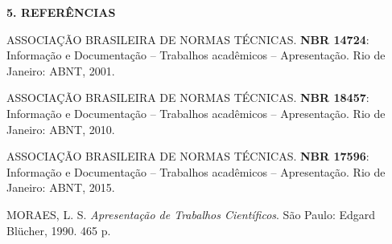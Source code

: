 \documentclass[final]{beamer}
\begin{document}
\begin{frame}[t]
\begin{columns}[t,totalwidth=0.6\paperwidth]
\begin{column}{0.45\textwidth}
    \vspace{1.3cm}
    {\large\bfseries 5. REFERÊNCIAS}\par

     \vspace{1.3cm}

    
    ASSOCIAÇÃO BRASILEIRA DE NORMAS TÉCNICAS. \textbf{NBR 14724}:
    Informação e Documentação – Trabalhos acadêmicos – Apresentação.
    Rio de Janeiro: ABNT, 2001.\par\medskip
    ASSOCIAÇÃO BRASILEIRA DE NORMAS TÉCNICAS. \textbf{NBR 18457}:
    Informação e Documentação – Trabalhos acadêmicos – Apresentação.
    Rio de Janeiro: ABNT, 2010.\par\medskip
    ASSOCIAÇÃO BRASILEIRA DE NORMAS TÉCNICAS. \textbf{NBR 17596}:
    Informação e Documentação – Trabalhos acadêmicos – Apresentação.
    Rio de Janeiro: ABNT, 2015.\par\medskip
    MORAES, L. S. \textit{Apresentação de Trabalhos Científicos}.
    São Paulo: Edgard Blücher, 1990. 465 p.
    \normalsize
  \end{column}
\end{columns}

\end{frame}
\end{document}
